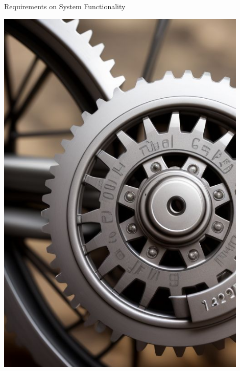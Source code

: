 \documentclass{beamer}
\begin{document}
\begin{frame}[fragile]{Requirements on System Functionality}
\begin{minipage}[t]{0.3\textwidth}
\hfill\includegraphics[width=0.9\textwidth]{img/cogs}
\end{minipage}%
\end{frame}
\end{document}
